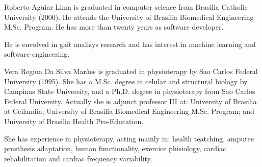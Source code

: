\documentclass[journal]{IEEEtran}
\begin{document}


% 

\begin{IEEEbiography}{Roberto Aguiar Lima}
	is graduated in computer science from Brasilia Catholic University (2000).
	He attends the University of Brasilia Biomedical Engineering M.Sc. Program.
	He has more than twenty years as software developer.

	He is envolved in gait analisys research and has interest in machine learning and software engineering.
\end{IEEEbiography}

\begin{IEEEbiography}{Vera Regina Da Silva Marães}
	is graduated in physioterapy by Sao Carlos Federal University (1995). She has a M.Sc. degree in 
	celular and structural biology by Campinas State University, and a Ph.D. degree in physioterapy
	from Sao Carlos Federal University. 
	Actually she is  adjunct professor III at: University of Brasilia at Ceilandia; 
	University of Brasilia Biomedical Engineering M.Sc. Program;
	and University of Brasilia Health Pro-Education.

	She has experience in physioterapy, acting mainly in: health teatching, amputee prosthesis adaptation,
	human functionality, exercice phisiology, cardiac rehabilitation and cardiac frequency variability.
\end{IEEEbiography}
\end{document}
